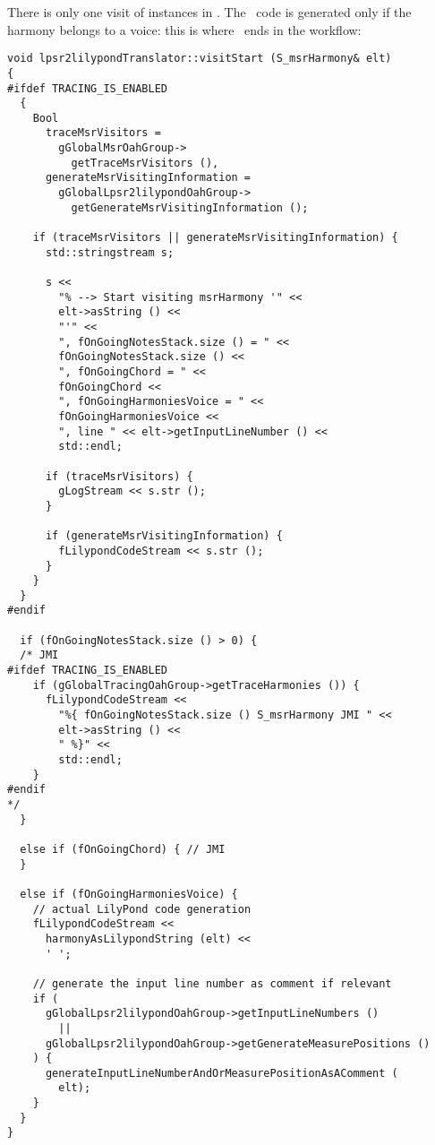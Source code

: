 There is only one visit of  instances in . The \lily\ code is generated only if the harmony belongs to a voice: this is where \denorm\ ends in the workflow:%
\begin{lstlisting}[language=CPlusPlus]
void lpsr2lilypondTranslator::visitStart (S_msrHarmony& elt)
{
#ifdef TRACING_IS_ENABLED
  {
    Bool
      traceMsrVisitors =
        gGlobalMsrOahGroup->
          getTraceMsrVisitors (),
      generateMsrVisitingInformation =
        gGlobalLpsr2lilypondOahGroup->
          getGenerateMsrVisitingInformation ();

    if (traceMsrVisitors || generateMsrVisitingInformation) {
      std::stringstream s;

      s <<
        "% --> Start visiting msrHarmony '" <<
        elt->asString () <<
        "'" <<
        ", fOnGoingNotesStack.size () = " <<
        fOnGoingNotesStack.size () <<
        ", fOnGoingChord = " <<
        fOnGoingChord <<
        ", fOnGoingHarmoniesVoice = " <<
        fOnGoingHarmoniesVoice <<
        ", line " << elt->getInputLineNumber () <<
        std::endl;

      if (traceMsrVisitors) {
        gLogStream << s.str ();
      }

      if (generateMsrVisitingInformation) {
        fLilypondCodeStream << s.str ();
      }
    }
  }
#endif

  if (fOnGoingNotesStack.size () > 0) {
  /* JMI
#ifdef TRACING_IS_ENABLED
    if (gGlobalTracingOahGroup->getTraceHarmonies ()) {
      fLilypondCodeStream <<
        "%{ fOnGoingNotesStack.size () S_msrHarmony JMI " <<
        elt->asString () <<
        " %}" <<
        std::endl;
    }
#endif
*/
  }

  else if (fOnGoingChord) { // JMI
  }

  else if (fOnGoingHarmoniesVoice) {
    // actual LilyPond code generation
    fLilypondCodeStream <<
      harmonyAsLilypondString (elt) <<
      ' ';

    // generate the input line number as comment if relevant
    if (
      gGlobalLpsr2lilypondOahGroup->getInputLineNumbers ()
        ||
      gGlobalLpsr2lilypondOahGroup->getGenerateMeasurePositions ()
    ) {
      generateInputLineNumberAndOrMeasurePositionAsAComment (
        elt);
    }
  }
}
\end{lstlisting}

